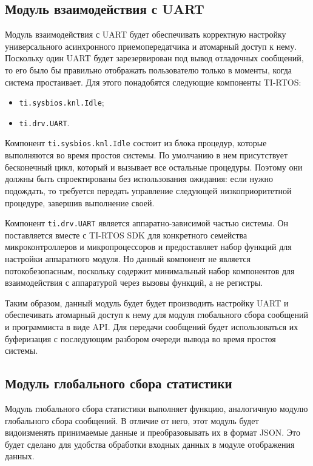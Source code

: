 \subsection{Модуль взаимодействия с UART}

Модуль взаимодействия с UART будет обеспечивать корректную настройку универсального
асинхронного приемопередатчика и атомарный доступ к нему. Поскольку один UART
будет зарезервирован под вывод отладочных сообщений, то его было бы правильно
отображать пользователю только в моменты, когда система простаивает. Для
этого понадобятся следующие компоненты TI-RTOS:
\begin{itemize}
    \item \texttt{ti.sysbios.knl.Idle};
    \item \texttt{ti.drv.UART}.
\end{itemize}

Компонент \texttt{ti.sysbios.knl.Idle} состоит из блока процедур, которые
выполняются во время простоя системы. По умолчанию в нем присутствует бесконечный
цикл, который и вызывает все остальные процедуры. Поэтому они должны быть
спроектированы без использования ожидания: если нужно подождать, то требуется
передать управление следующей низкоприоритетной процедуре, завершив выполнение
своей.

Компонент \texttt{ti.drv.UART} является аппаратно-зависимой частью системы.
Он поставляется вместе с TI-RTOS SDK для конкретного семейства микроконтроллеров
и микропроцессоров и предоставляет набор функций для настройки аппаратного
модуля. Но данный компонент не является потокобезопасным, поскольку содержит
минимальный набор компонентов для взаимодействия с аппаратурой через вызовы
функций, а не регистры.

Таким образом, данный модуль будет будет производить настройку UART и обеспечивать
атомарный доступ к нему для модуля глобального сбора сообщений и программиста в
виде API. Для передачи сообщений будет использоваться их буферизация
с последующим разбором очереди вывода во время простоя системы.

\subsection{Модуль глобального сбора статистики}

Модуль глобального сбора статистики выполняет функцию, аналогичную
модулю глобального сбора сообщений. В отличие от него, этот модуль
будет видоизменять принимаемые данные и преобразовывать их в формат JSON.
Это будет сделано для удобства обработки входных данных в модуле отображения
данных.

